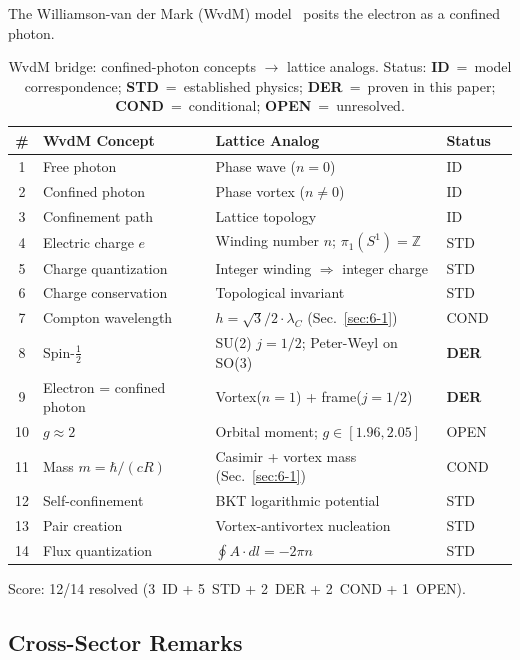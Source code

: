 \documentclass[aps,prd,onecolumn,superscriptaddress,floatfix,12pt]{revtex4-2}
\begin{document}
The Williamson-van der Mark (WvdM) model~\cite{Williamson1997} posits the electron as a confined photon.

\begin{table}[t]
\caption{WvdM bridge: confined-photon concepts $\to$ lattice analogs. Status: \textbf{ID}~=~model correspondence; \textbf{STD}~=~established physics; \textbf{DER}~=~proven in this paper; \textbf{COND}~=~conditional; \textbf{OPEN}~=~unresolved.}
\label{tab:wvdm}
\begin{tabular}{clllc}
\toprule
\# & WvdM Concept & Lattice Analog & Status \\
\midrule
1 & Free photon & Phase wave ($n = 0$) & ID \\
2 & Confined photon & Phase vortex ($n \neq 0$) & ID \\
3 & Confinement path & Lattice topology & ID \\
4 & Electric charge $e$ & Winding number $n$; $\pi_1(S^1) = \mathbb{Z}$ & STD \\
5 & Charge quantization & Integer winding $\Rightarrow$ integer charge & STD \\
6 & Charge conservation & Topological invariant & STD \\
7 & Compton wavelength & $h = \sqrt{3}/2 \cdot \lambda_C$ (Sec.~\ref{sec:6-1}) & COND \\
8 & Spin-$\frac{1}{2}$ & SU(2) $j = 1/2$; Peter-Weyl on SO(3) & \textbf{DER} \\
9 & Electron = confined photon & Vortex($n{=}1$) + frame($j{=}1/2$) & \textbf{DER} \\
10 & $g \approx 2$ & Orbital moment; $g \in [1.96, 2.05]$ & OPEN \\
11 & Mass $m = \hbar/(cR)$ & Casimir + vortex mass (Sec.~\ref{sec:6-1}) & COND \\
12 & Self-confinement & BKT logarithmic potential & STD \\
13 & Pair creation & Vortex-antivortex nucleation & STD \\
14 & Flux quantization & $\oint A \cdot dl = -2\pi n$ & STD \\
\bottomrule
\end{tabular}
\end{table}

Score: 12/14 resolved (3~ID + 5~STD + 2~DER + 2~COND + 1~OPEN).

\subsection{Cross-Sector Remarks}\label{sec:4-6}
\end{document}
